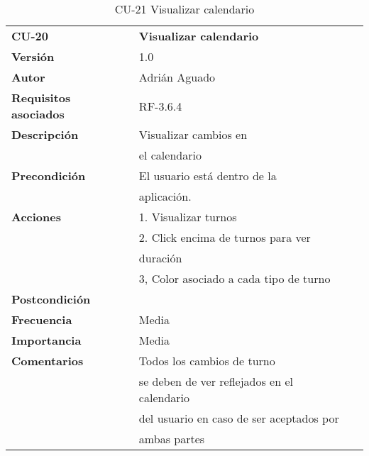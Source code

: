\begin{table}
\begin{tabular}{llr}  
\toprule
\begin{minipage}[b]{0.24\columnwidth}\raggedright\strut
\textbf{CU-20}\strut
\end{minipage} & \begin{minipage}[b]{0.72\columnwidth}\raggedright\strut
\textbf{Visualizar calendario}\strut
\end{minipage}\tabularnewline
\cmidrule(r){1-2}
\textbf{Versión}       & 1.0           \\
\textbf{Autor}       & Adrián  Aguado    \\
\textbf{Requisitos asociados}       & RF-3.6.4  \\
\textbf{Descripción} & Visualizar cambios en \\
& el  calendario \\
\textbf{Precondición}  & El usuario está dentro de la \\
& aplicación. \\
\textbf{Acciones} & 1. Visualizar turnos \\
& 2. Click encima de turnos para ver \\
&  duración  \\
&  3, Color asociado a cada tipo de turno  \\
\textbf{Postcondición} & \\
\textbf{Frecuencia} & Media          \\
\textbf{Importancia} & Media           \\
\textbf{Comentarios } &  Todos los cambios de turno  \\
 &  se deben de ver reflejados en el calendario  \\
  &  del usuario en caso de ser aceptados por  \\
    &  ambas partes \\
\bottomrule
\end{tabular}
\caption{CU-21 Visualizar calendario} 
\end{table}





